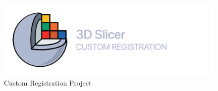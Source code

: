 \documentclass{article}
\begin{document}
{    \bigskip

    \begin{figure}[!ht]
        \centering
        \includegraphics[width=\textwidth]{images/custom-registration-logo.png}
        \caption{Custom Registration Project}
        \label{fig:custom-registration-logo}
    \end{figure}

    \newpage
}
\end{document}
